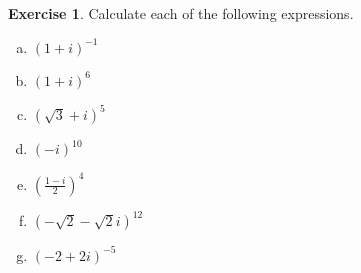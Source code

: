 \documentclass{article}
\theoremstyle{definition}
\newtheorem{theorem}{Exercise}[section]
\theoremstyle{remark}
\newcommand{\inv}[1]{#1^{-1}}
\begin{document}
	\setcounter{theorem}{17}
	\begin{theorem} Calculate each of the following expressions.
		\begin{multicols}{4} 
			\noindent
			\begin{enumerate}[(a)]
				\item $\inv{\left(1+i\right)}$
				\item $\left(1+i\right)^6$
				\item $\left(\sqrt{3}+i\right)^5$
				\item $\left(-i\right)^{10}$
				\item $\left(\frac{1-i}{2}\right)^4$
				\item $\left(-\sqrt{2}-\sqrt{2}i\right)^{12}$
				\item $\left(-2+2i\right)^{-5}$
			\end{enumerate}
		\end{multicols} 
	\end{theorem}
\end{document}
